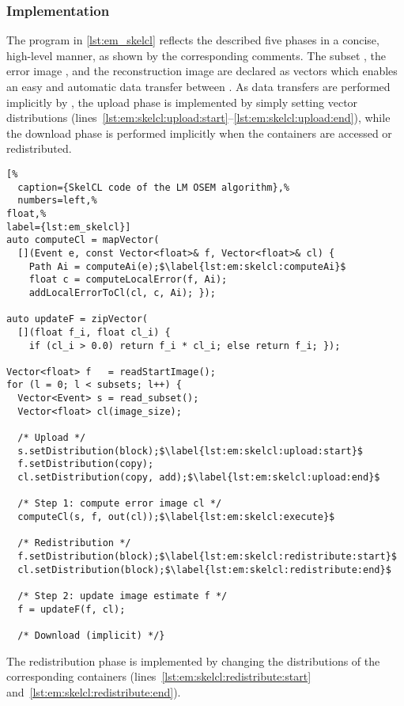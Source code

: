 \subsubsection*{\SkelCL Implementation}

The \SkelCL program in \autoref{lst:em_skelcl} reflects the described five phases in a concise, high-level manner, as shown by the corresponding comments.
The subset , the error image , and the reconstruction image  are declared as \SkelCL vectors which enables an easy and automatic data transfer between \GPUs.
As data transfers are performed implicitly by \SkelCL, the upload phase is implemented by simply setting vector distributions (lines~\ref{lst:em:skelcl:upload:start}--\ref{lst:em:skelcl:upload:end}), while the download phase is performed implicitly when the \SkelCL containers are accessed or redistributed.
\begin{lstlisting}[%
  caption={SkelCL code of the LM OSEM algorithm},%
  numbers=left,%
float,%
label={lst:em_skelcl}]
auto computeCl = mapVector(
  [](Event e, const Vector<float>& f, Vector<float>& cl) {
    Path Ai = computeAi(e);$\label{lst:em:skelcl:computeAi}$
    float c = computeLocalError(f, Ai);
    addLocalErrorToCl(cl, c, Ai); });

auto updateF = zipVector(
  [](float f_i, float cl_i) {
    if (cl_i > 0.0) return f_i * cl_i; else return f_i; });

Vector<float> f   = readStartImage();
for (l = 0; l < subsets; l++) {
  Vector<Event> s = read_subset();
  Vector<float> cl(image_size);

  /* Upload */
  s.setDistribution(block);$\label{lst:em:skelcl:upload:start}$
  f.setDistribution(copy);
  cl.setDistribution(copy, add);$\label{lst:em:skelcl:upload:end}$

  /* Step 1: compute error image cl */
  computeCl(s, f, out(cl));$\label{lst:em:skelcl:execute}$

  /* Redistribution */
  f.setDistribution(block);$\label{lst:em:skelcl:redistribute:start}$
  cl.setDistribution(block);$\label{lst:em:skelcl:redistribute:end}$

  /* Step 2: update image estimate f */
  f = updateF(f, cl);

  /* Download (implicit) */}
\end{lstlisting}
The redistribution phase is implemented by changing the distributions of the corresponding \SkelCL containers (lines~\ref{lst:em:skelcl:redistribute:start} and~\ref{lst:em:skelcl:redistribute:end}).

